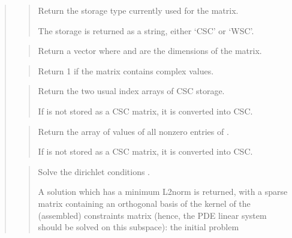 \documentclass[a4paper,11pt,english]{sphinxmanual}
\begin{document}
\begin{quote}
\begin{quote}
Return the storage type currently used for the matrix.

The storage is returned as a string, either ‘CSC’ or ‘WSC’.
\end{quote}

\begin{quote}

Return a vector where  and  are the dimensions of the matrix.
\end{quote}

\begin{quote}

Return 1 if the matrix contains complex values.
\end{quote}

\begin{quote}

Return the two usual index arrays of CSC storage.

If  is not stored as a CSC matrix, it is converted into CSC.
\end{quote}

\begin{quote}

Return the array of values of all non\sphinxhyphen{}zero entries of .

If  is not stored as a CSC matrix, it is converted into CSC.
\end{quote}

\begin{quote}

Solve the dirichlet conditions .

A solution  which has a minimum L2\sphinxhyphen{}norm is returned, with a
sparse matrix  containing an orthogonal basis of the kernel of
the (assembled) constraints matrix  (hence, the PDE linear system
should be solved on this subspace): the initial problem


\end{quote}
\end{quote}
\end{document}
